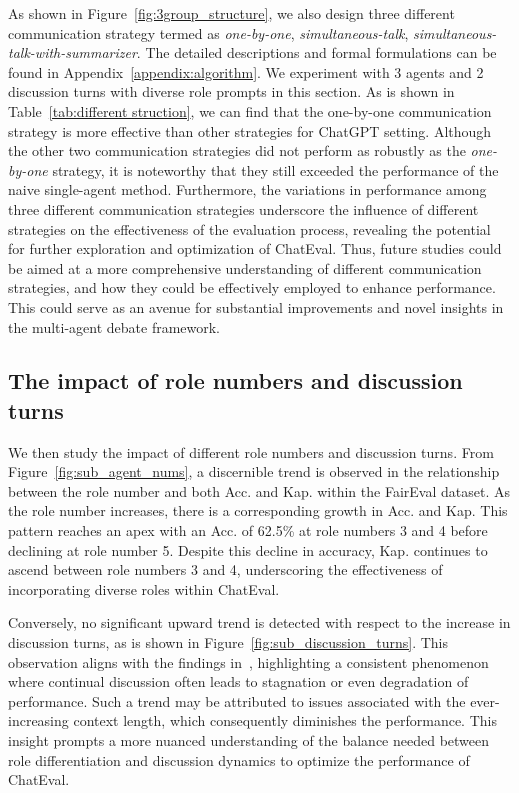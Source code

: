 As shown in Figure~\ref{fig:3group_structure}, we also design three different communication strategy termed as \textit{one-by-one}, \textit{simultaneous-talk}, \textit{simultaneous-talk-with-summarizer}. The detailed descriptions and formal formulations can be found in Appendix~\ref{appendix:algorithm}. We experiment with 3 agents and 2 discussion turns with diverse role prompts in this section. As is shown in Table~\ref{tab:different struction}, we can find that the one-by-one communication strategy is more effective than other strategies for ChatGPT setting. Although the other two communication strategies did not perform as robustly as the \textit{one-by-one} strategy, it is noteworthy that they still exceeded the performance of the naive single-agent method. Furthermore, the variations in performance among three different communication strategies underscore the influence of different strategies on the effectiveness of the evaluation process, revealing the potential for further exploration and optimization of ChatEval. Thus, future studies could be aimed at a more comprehensive understanding of different communication strategies, and how they could be effectively employed to enhance performance. This could serve as an avenue for substantial improvements and novel insights in the multi-agent debate framework.  


\subsection{The impact of role numbers and discussion turns}\label{subsec:role_num_turn}

We then study the impact of different role numbers and discussion turns.
From Figure~\ref{fig:sub_agent_nums}, a discernible trend is observed in the relationship between the role number and both Acc. and Kap. within the FairEval dataset. As the role number increases, there is a corresponding growth in Acc. and Kap. This pattern reaches an apex with an Acc. of 62.5\% at role numbers 3 and 4 before declining at role number 5. Despite this decline in accuracy, Kap. continues to ascend between role numbers 3 and 4, underscoring the effectiveness of incorporating diverse roles within ChatEval.

Conversely, no significant upward trend is detected with respect to the increase in discussion turns, as is shown in Figure~\ref{fig:sub_discussion_turns}. This observation aligns with the findings in~\cite{liang2023encouraging, du2023improving}, highlighting a consistent phenomenon where continual discussion often leads to stagnation or even degradation of performance. Such a trend may be attributed to issues associated with the ever-increasing context length, which consequently diminishes the performance. This insight prompts a more nuanced understanding of the balance needed between role differentiation and discussion dynamics to optimize the performance of ChatEval.



